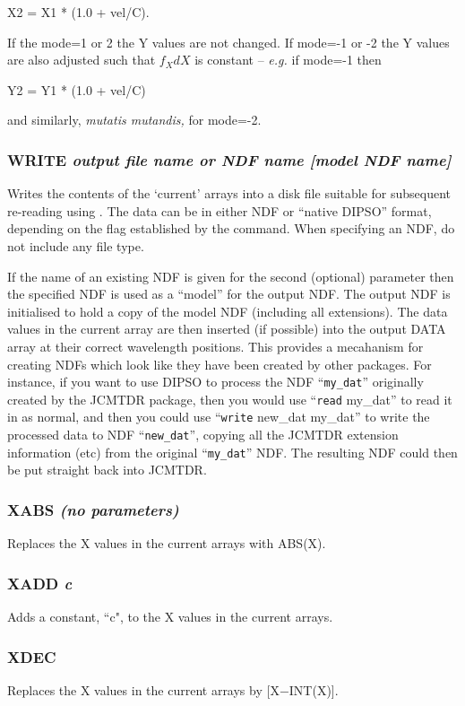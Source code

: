 \documentclass[twoside,11pt,noabs,nolof]{starlink}
\providecommand{\dipcom}[3]{\subsubsection*{\label{COM:#1}\xlabel{COM:#1}\textbf{#1} \emph{#2}}}
\begin{document}
\begin{terminalv}
X2 = X1 * (1.0 + vel/C).
\end{terminalv}

If the mode=1 or 2 the Y values are not changed. If mode=-1 or -2 the
Y values are also adjusted such that $f_{X}dX$ is constant -- \textit{e.g.} if mode=-1 then

\begin{terminalv}
Y2 = Y1 * (1.0 + vel/C)
\end{terminalv}

and similarly, \textit{mutatis mutandis,} for mode=-2.

\dipcom{WRITE}{output file name or NDF name [model NDF name]}{Write data to a disk file from the current arrays (see {\texttt{READ}})}
Writes the contents of the `current' arrays into a disk file suitable for
subsequent re-reading using .  The data can be in either NDF or ``native
DIPSO'' format, depending on the flag established by the   command.
When specifying an NDF, do not include any file type.

If the name of an existing NDF is given for the second (optional) parameter
then the specified NDF is used as a ``model'' for the output NDF. The
output NDF is initialised to hold a copy of the model NDF (including all
extensions). The data values in the current array are then inserted (if
possible) into the output DATA array at their correct wavelength
positions. This provides a mecahanism for creating NDFs which look like
they have been created by other packages. For instance, if you want to
use DIPSO to process the NDF ``{\texttt{my\_dat}}''  originally created by the
JCMTDR package, then you would use ``{\texttt{read}  my\_dat}'' to read it in
as normal, and then you could use ``{\texttt{write}  new\_dat my\_dat}'' to
write the processed data to NDF ``{\texttt{new\_dat}}'',  copying all the
JCMTDR extension information (etc) from the original ``{\texttt{my\_dat}}''
NDF. The resulting NDF could then be put straight back into JCMTDR.

\dipcom{XABS}{(no parameters)}{Replaces X values in the current arrays with their absolute value}
Replaces the X values in the current arrays with ABS(X).

\dipcom{XADD}{c}{Adds a constant to the X values in the current arrays}
Adds a constant, ``c", to the X values in the current arrays.

\dipcom{XDEC}{}{Replaces X values in the current arrays by X-INT(X)}
Replaces the X values in the current arrays by [X$-$INT(X)].
\end{document}
